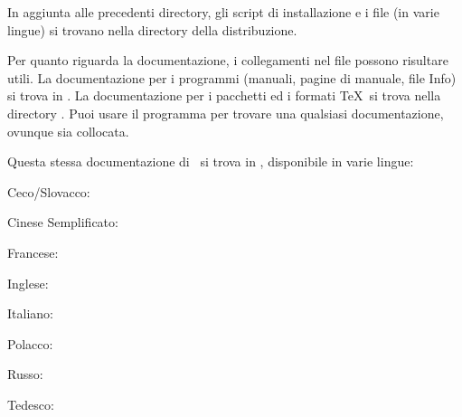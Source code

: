 \documentclass{article}
\begin{document}
In aggiunta alle precedenti directory, gli script di installazione e i
file  (in varie lingue) si trovano nella directory della
distribuzione.

Per quanto riguarda la documentazione, i collegamenti nel file
 possono risultare utili. La documentazione per i programmi
(manuali, pagine di manuale, file Info) si trova in .
La documentazione per i pacchetti ed i formati \TeX\ si trova nella
directory . Puoi usare il programma
 per trovare una qualsiasi documentazione, ovunque sia
collocata.

Questa stessa documentazione di \TL\ si trova in
, disponibile in varie lingue:

\begin{itemize*}
\item{Ceco/Slovacco:} 
\item{Cinese Semplificato:} 
\item{Francese:} 
\item{Inglese:} 
\item{Italiano:} 
\item{Polacco:} 
\item{Russo:} 
\item{Tedesco:} 
\end{itemize*}
\end{document}
